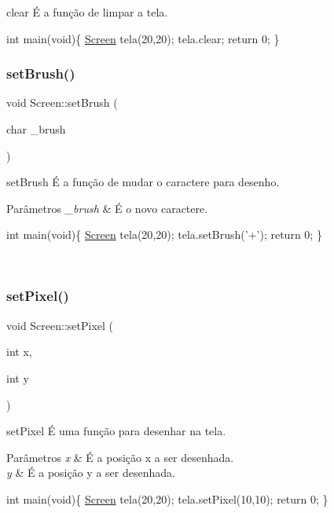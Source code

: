 clear É a função de limpar a tela. 


\begin{DoxyPre}
int main(void)\{
   \mbox{\hyperlink{class_screen}{Screen}} tela(20,20);
   tela.clear;
   return 0;
\}
\end{DoxyPre}
 \mbox{\label{class_screen_aebc4eb6cb5acf15a0f04c1494622ab23}} 
\subsubsection{\texorpdfstring{set\+Brush()}{setBrush()}}
{\footnotesize\ttfamily void Screen\+::set\+Brush (\begin{DoxyParamCaption}\item[{char}]{\+\_\+brush }\end{DoxyParamCaption})}



set\+Brush É a função de mudar o caractere para desenho. 


\begin{DoxyParams}{Parâmetros}
{\em \+\_\+brush} & É o novo caractere. 
\begin{DoxyPre}
int main(void)\{
   \mbox{\hyperlink{class_screen}{Screen}} tela(20,20);
   tela.setBrush('+');
   return 0;
\}
\end{DoxyPre}
 \\
\hline
\end{DoxyParams}
\mbox{\label{class_screen_ae6bea81c57a22d226507c3c26fa95ee0}} 
\subsubsection{\texorpdfstring{set\+Pixel()}{setPixel()}}
{\footnotesize\ttfamily void Screen\+::set\+Pixel (\begin{DoxyParamCaption}\item[{int}]{x,  }\item[{int}]{y }\end{DoxyParamCaption})}



set\+Pixel É uma função para desenhar na tela. 


\begin{DoxyParams}{Parâmetros}
{\em x} & É a posição x a ser desenhada. \\
\hline
{\em y} & É a posição y a ser desenhada. 
\begin{DoxyPre}
int main(void)\{
   \mbox{\hyperlink{class_screen}{Screen}} tela(20,20);
   tela.setPixel(10,10);
   return 0;
\}
\end{DoxyPre}
 \\
\hline
\end{DoxyParams}


